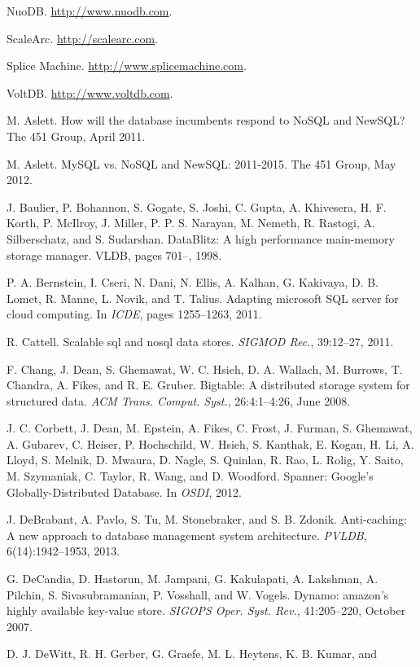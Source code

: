 \documentclass[a4paper,12pt,notitlepage,twoside,openright]{article}
\begin{document}
\begin{enumerate}[label={[}\arabic*{]}]
\item NuoDB. \url{http://www.nuodb.com}.
\item ScaleArc. \url{http://scalearc.com}.
\item
  Splice Machine. \url{http://www.splicemachine.com}.
\item
  VoltDB. \url{http://www.voltdb.com}.
\item
  M. Aslett. How will the database incumbents respond to NoSQL and
  NewSQL? The 451 Group, April 2011.
\item
  M. Aslett. MySQL vs. NoSQL and NewSQL:
2011-2015. The 451 Group, May 2012.
\item
  J. Baulier, P. Bohannon, S. Gogate, S. Joshi, C. Gupta, A. Khivesera,
  H. F. Korth, P. McIlroy, J. Miller, P. P. S.
Narayan, M. Nemeth, R. Rastogi, A. Silberschatz, and S. Sudarshan.
DataBlitz: A high performance main-memory storage manager. VLDB, pages
701--, 1998.
\item
  P. A. Bernstein, I. Cseri, N. Dani, N. Ellis, A. Kalhan,
G. Kakivaya, D. B. Lomet, R. Manne, L. Novik, and T. Talius. Adapting
microsoft SQL server for cloud computing. In \emph{ICDE}, pages
1255--1263, 2011.
\item
  R. Cattell. Scalable sql and nosql data stores. \emph{SIGMOD Rec.},
  39:12--27, 2011.
\item
  F. Chang, J. Dean, S. Ghemawat, W. C. Hsieh, D. A.
Wallach, M. Burrows, T. Chandra, A. Fikes, and R. E. Gruber. Bigtable: A
distributed storage system for structured data. \emph{ACM Trans. Comput.
Syst.}, 26:4:1--4:26, June 2008.
\item
  J. C. Corbett, J. Dean, M. Epstein, A. Fikes, C. Frost,
J. Furman, S. Ghemawat, A. Gubarev, C. Heiser,
P. Hochschild, W. Hsieh, S. Kanthak, E. Kogan, H. Li,
A. Lloyd, S. Melnik, D. Mwaura, D. Nagle, S. Quinlan,
R. Rao, L. Rolig, Y. Saito, M. Szymaniak, C. Taylor, R. Wang, and D.
Woodford. Spanner: Google's Globally-Distributed Database. In
\emph{OSDI}, 2012.
\item
  J. DeBrabant, A. Pavlo, S. Tu, M. Stonebraker, and S. B. Zdonik.
  Anti-caching: A new approach to database management system
  architecture. \emph{PVLDB}, 6(14):1942--1953, 2013.
\item
  G. DeCandia, D. Hastorun, M. Jampani, G. Kakulapati,
A. Lakshman, A. Pilchin, S. Sivasubramanian, P. Vosshall, and W. Vogels.
Dynamo: amazon's highly available key-value store. \emph{SIGOPS Oper.
Syst. Rev.}, 41:205--220, October 2007.
\item
  D. J. DeWitt, R. H. Gerber, G. Graefe, M. L. Heytens, K. B. Kumar, and

\end{enumerate}
\end{document}
